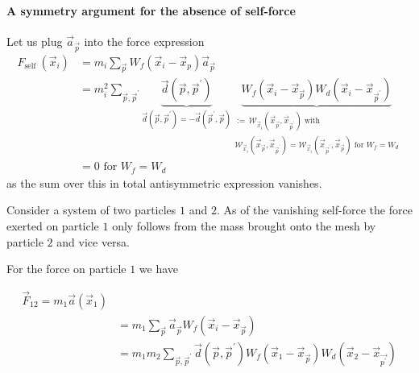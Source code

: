 \paragraph*{A symmetry argument for the absence of self-force} 
Let us plug $\vec{a}_\vec{p}$ into the force expression
\begin{equation}
    \begin{aligned}
    F_{\text {self }}\left(\vec{x}_i\right)&=m_i \sum_{\vec{p}} W_f\left(\vec{x}_i-\vec{x}_p\right) \vec{a}_{\vec{p}}\\&=m_i^2 \sum_{\vec{p}, \vec{p}^{\prime}} \underbrace{\vec{d}\left(\vec{p}, \vec{p}^{\prime}\right)}_{\vec{d}\left(\vec{p}, \vec{p}^{\prime}\right) = -\vec{d}\left(\vec{p}^{\prime}, \vec{p}\right)} \underbrace{W_f\left(\vec{x}_i-\vec{x}_{\vec{p}}\right) W_d\left(\vec{x}_i-\vec{x}_{\vec{p}^{\prime}}\right)}_{\begin{gathered}
        \scriptstyle := \, \mathcal{W}_{\vec{x}_i}(\vec{x}_{\vec{p}},\vec{x}_{\vec{p}^{\prime}}) \text{ with } \\ \scriptstyle \mathcal{W}_{\vec{x}_i}(\vec{x}_{\vec{p}},\vec{x}_{\vec{p}^{\prime}}) = \mathcal{W}_{\vec{x}_i}(\vec{x}_{\vec{p}^{\prime}},\vec{x}_{\vec{p}}) \text{ for } W_f = W_d
    \end{gathered}}  \\
    &= 0 \text{ for } W_f = W_d
    \end{aligned}
\end{equation}
as the sum over this in total antisymmetric expression vanishes.


Consider a system of two particles $1$ and $2$. As of the vanishing self-force
the force exerted on particle $1$ only follows from the mass brought onto the mesh by particle $2$ and vice versa.

For the force on particle $1$ we have

\begin{equation}
    \begin{aligned}
    \vec{F}_{12}=m_1 \vec{a}\left(\vec{x}_1\right) \\
    &= m_1 \sum_{\vec{p}} \vec{a}_\vec{p} W_f\left(\vec{x}_i-\vec{x}_{\vec{p}}\right) \\
    & =m_1 m_2 \sum_{\vec{p}, \vec{p}^{\prime}} \vec{d}\left(\vec{p}, \vec{p}^{\prime}\right) W_f\left(\vec{x}_1-\vec{x}_{\vec{p}}\right) W_d\left(\vec{x}_2-\vec{x}_{\vec{p^{\prime}}}\right)
    \end{aligned}
\end{equation}

